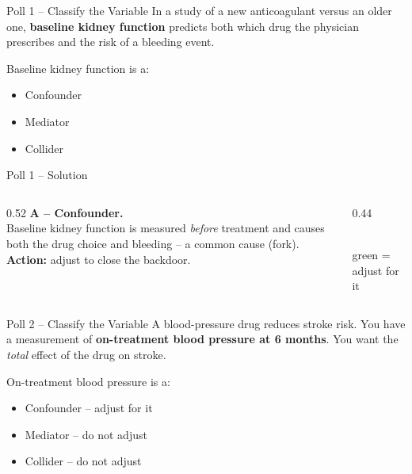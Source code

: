 \documentclass[aspectratio=169]{beamer}
\begin{document}
\begin{frame}{Poll 1 \;--\; Classify the Variable}
  \small
  In a study of a new anticoagulant versus an older one, \textbf{baseline kidney
  function} predicts both which drug the physician prescribes and the risk of
  a bleeding event.
  \vspace{0.8em}

  Baseline kidney function is a:
  \begin{itemize}
    \item[\textbf{A.}] Confounder
    \item[\textbf{B.}] Mediator
    \item[\textbf{C.}] Collider
  \end{itemize}
\end{frame}

\begin{frame}{Poll 1 \;--\; Solution}
  \small
  \begin{columns}[T]
    \begin{column}{0.52\textwidth}
      \textcolor{good}{\textbf{A -- Confounder.}}\\[0.4em]
      Baseline kidney function is measured \emph{before} treatment and causes
      both the drug choice and bleeding -- a common cause (fork).\\[0.4em]
      \textcolor{accent}{\textbf{Action:}} adjust to close the backdoor.
    \end{column}
    \begin{column}{0.44\textwidth}
      \centering
      \\[0.3em]
      {\scriptsize\textcolor{good}{green = adjust for it}}
    \end{column}
  \end{columns}
\end{frame}

\begin{frame}{Poll 2 \;--\; Classify the Variable}
  \small
  A blood-pressure drug reduces stroke risk. You have a measurement of
  \textbf{on-treatment blood pressure at 6 months}. You want the
  \emph{total} effect of the drug on stroke.
  \vspace{0.8em}

  On-treatment blood pressure is a:
  \begin{itemize}
    \item[\textbf{A.}] Confounder -- adjust for it
    \item[\textbf{B.}] Mediator -- do not adjust
    \item[\textbf{C.}] Collider -- do not adjust
  \end{itemize}
\end{frame}
\end{document}
